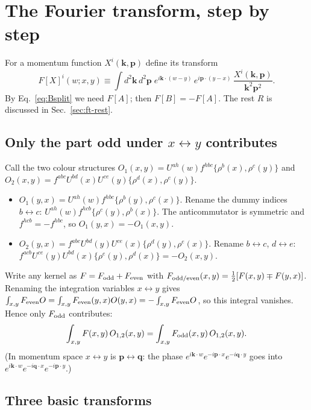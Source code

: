 \documentclass[10pt]{article}
\numberwithin{equation}{section}
\newcommand{\bk}{\mathbf k}
\newcommand{\bp}{\mathbf p}
\newcommand{\bq}{\mathbf q}
\begin{document}
\section{The Fourier transform, step by step}\label{sec:ft-steps}
For a momentum function $X^i(\bk,\bp)$ define its transform
\begin{equation}
F[X]^i(w;x,y)\equiv\int d^2\bk\,d^2\bp\;e^{i\bk\cdot(w-y)}\,e^{i\bp\cdot(y-x)}\,\frac{X^i(\bk,\bp)}{\bk^2\bp^2}.
\end{equation}
By Eq.~\eqref{eq:Bsplit} we need $F[A]$; then $F[B]=-F[A]$. The rest $R$ is discussed in Sec.~\ref{sec:ft-rest}.

\subsection{Only the part odd under \texorpdfstring{$x\leftrightarrow y$}{x<->y} contributes}\label{sec:ft-odd}
Call the two colour structures $O_1(x,y)=U^{ah}(w)f^{hbc}\{\rho^b(x),\rho^c(y)\}$ and $O_2(x,y)=f^{abc}U^{bd}(x)U^{ce}(y)\{\rho^d(x),\rho^e(y)\}$.
\begin{itemize}
\item $O_1(y,x)=U^{ah}(w)f^{hbc}\{\rho^b(y),\rho^c(x)\}$. Rename the dummy indices $b\leftrightarrow c$: $U^{ah}(w)f^{hcb}\{\rho^c(y),\rho^b(x)\}$. The anticommutator is symmetric and $f^{hcb}=-f^{hbc}$, so $O_1(y,x)=-O_1(x,y)$.
\item $O_2(y,x)=f^{abc}U^{bd}(y)U^{ce}(x)\{\rho^d(y),\rho^e(x)\}$. Rename $b\leftrightarrow c$, $d\leftrightarrow e$: $f^{acb}U^{ce}(y)U^{bd}(x)\{\rho^e(y),\rho^d(x)\}=-O_2(x,y)$.
\end{itemize}
Write any kernel as $F=F_{\rm odd}+F_{\rm even}$ with $F_{\rm odd/even}(x,y)=\frac12[F(x,y)\mp F(y,x)]$. Renaming the integration variables $x\leftrightarrow y$ gives $\int_{x,y}F_{\rm even}O=\int_{x,y}F_{\rm even}(y,x)O(y,x)=-\int_{x,y}F_{\rm even}O$, so this integral vanishes. Hence only $F_{\rm odd}$ contributes:
\begin{equation}
\int_{x,y}F(x,y)\,O_{1,2}(x,y)=\int_{x,y}F_{\rm odd}(x,y)\,O_{1,2}(x,y).
\end{equation}
(In momentum space $x\leftrightarrow y$ is $\bp\leftrightarrow\bq$: the phase $e^{i\bk\cdot w}e^{-i\bp\cdot x}e^{-i\bq\cdot y}$ goes into $e^{i\bk\cdot w}e^{-i\bq\cdot x}e^{-i\bp\cdot y}$.)

\subsection{Three basic transforms}\label{sec:ft-basic}
\end{document}
